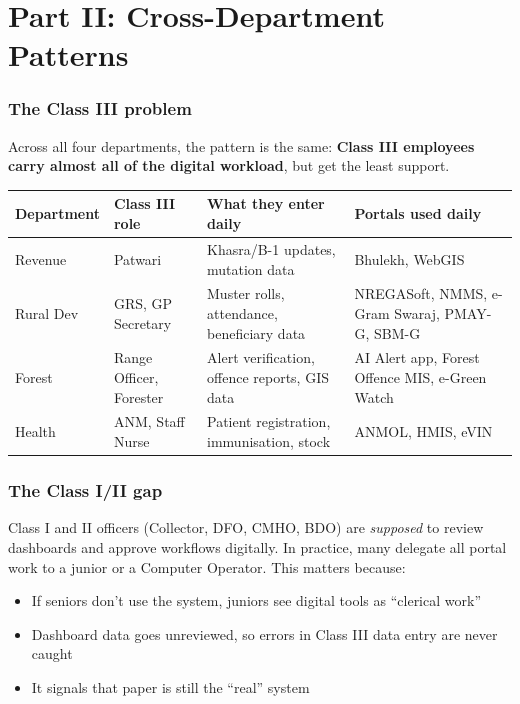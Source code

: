 \documentclass[11pt,a4paper]{article}
\begin{document}
\newpage
\part*{Part II: Cross-Department Patterns}

\section{The Class III problem}

Across all four departments, the pattern is the same: \textbf{Class III employees carry almost all of the digital workload}, but get the least support.

\begin{tabularx}{\textwidth}{@{}L{3cm} L{3.5cm} L{3.5cm} X@{}}
\toprule
\textbf{Department} & \textbf{Class III role} & \textbf{What they enter daily} & \textbf{Portals used daily} \\
\midrule
Revenue & Patwari & Khasra/B-1 updates, mutation data & Bhulekh, WebGIS \\
Rural Dev & GRS, GP Secretary & Muster rolls, attendance, beneficiary data & NREGASoft, NMMS, e-Gram Swaraj, PMAY-G, SBM-G \\
Forest & Range Officer, Forester & Alert verification, offence reports, GIS data & AI Alert app, Forest Offence MIS, e-Green Watch \\
Health & ANM, Staff Nurse & Patient registration, immunisation, stock & ANMOL, HMIS, eVIN \\
\bottomrule
\end{tabularx}

\section{The Class I/II gap}

Class I and II officers (Collector, DFO, CMHO, BDO) are \textit{supposed} to review dashboards and approve workflows digitally. In practice, many delegate all portal work to a junior or a Computer Operator. This matters because:
\begin{itemize}[nosep]
  \item If seniors don't use the system, juniors see digital tools as ``clerical work''
  \item Dashboard data goes unreviewed, so errors in Class III data entry are never caught
  \item It signals that paper is still the ``real'' system
\end{itemize}
\end{document}
